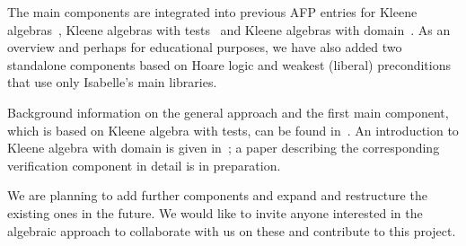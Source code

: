 \documentclass[11pt,a4paper]{article}
\begin{document}
The main components  are integrated into previous AFP entries
for Kleene algebras~\cite{afp:ka}, Kleene algebras with
tests~\cite{afp:kat} and Kleene algebras with domain~\cite{afp:kad}.
As an overview and perhaps for educational purposes, we have also
added two standalone components based on Hoare logic and weakest
(liberal) preconditions  that use only Isabelle's main libraries.

Background information on the general approach and the first main
component, which is based on Kleene algebra with tests, can be found
in~\cite{ArmstrongGS15}. An introduction to Kleene algebra with domain
is given in~\cite{DesharnaisS11}; a paper describing the corresponding
verification component in detail is in preparation.

We are planning to add further components and expand and restructure
the existing ones in the future. We would like to invite anyone
interested in the algebraic approach to collaborate with us on these
and contribute to this project.





\end{document}
